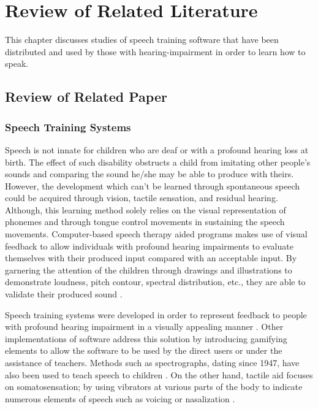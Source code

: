 %
%
%                 

\chapter{Review of Related Literature}
\label{sec:relatedlit}

This chapter discusses studies of speech training software that have been distributed and used by those with hearing-impairment in order to learn how to speak.

\section{Review of Related Paper}

\subsection{Speech Training Systems}

Speech is not innate for children who are deaf or with a profound hearing loss at birth. The effect of such disability obstructs a child from imitating other people's sounds and comparing the sound he/she may be able to produce with theirs. However, the development which can't be learned through spontaneous speech could be acquired through vision, tactile sensation, and residual hearing. Although, this learning method solely relies on the visual representation of phonemes and through tongue control movements in sustaining the speech movements. Computer-based speech therapy aided programs makes use of visual feedback to allow individuals with profound hearing impairments to evaluate themselves with their produced input compared with an acceptable input. By garnering the attention of the children through drawings and illustrations to demonstrate loudness, pitch contour, spectral distribution, etc., they are able to validate their produced sound \cite{oster:2006:cbs}.

Speech training systems were developed in order to represent feedback to people with profound hearing impairment in a visually appealing manner \cite{oster:2006:cbs}. Other implementations of software address this solution by introducing gamifying elements to allow the software to be used by the direct users or under the assistance of teachers. Methods such as spectrographs, dating since 1947, have also been used to teach speech to children \cite{javkin:1993:msa}. On the other hand, tactile aid focuses on somatosensation; by using vibrators at various parts of the body to indicate numerous elements of speech such as voicing or nasalization \cite{wankhede:2014:dvs}.

